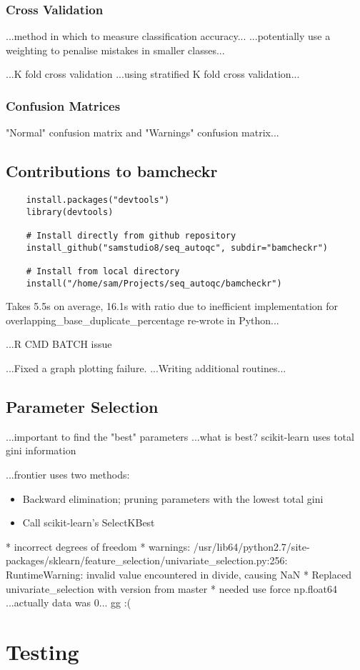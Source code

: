 \subsubsection{Cross Validation}

...method in which to measure classification accuracy...
...potentially use a weighting to penalise mistakes in smaller classes...

...K fold cross validation
...using stratified K fold cross validation...

\subsubsection{Confusion Matrices}
"Normal" confusion matrix and "Warnings" confusion matrix...

\subsection{Contributions to bamcheckr}
\begin{verbatim}
    install.packages("devtools")
    library(devtools)

    # Install directly from github repository
    install_github("samstudio8/seq_autoqc", subdir="bamcheckr")

    # Install from local directory
    install("/home/sam/Projects/seq_autoqc/bamcheckr")

\end{verbatim}
Takes 5.5s on average, 16.1s with ratio due to inefficient implementation
for overlapping\_base\_duplicate\_percentage
re-wrote in Python...


...R CMD BATCH issue

...Fixed a graph plotting failure.
...Writing additional routines...

\subsection{Parameter Selection}
...important to find the "best" parameters
...what is best? scikit-learn uses total gini information

...frontier uses two methods:
\begin{itemize}
    \item Backward elimination; pruning parameters with the lowest total gini
    \item Call scikit-learn's SelectKBest
\end{itemize}


* incorrect degrees of freedom
* warnings: /usr/lib64/python2.7/site-packages/sklearn/feature\_selection/univariate\_selection.py:256: RuntimeWarning: invalid value encountered in divide, causing NaN
* Replaced univariate\_selection with version from master
* needed use force np.float64
...actually data was 0... gg :(

\section{Testing}

